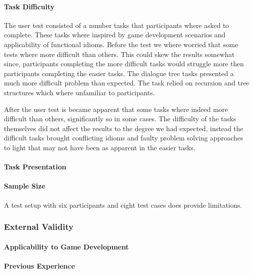 \paragraph{Task Difficulty}
The user test consisted of a number tasks that participants where asked to complete. These tasks where inspired by game development scenarios and applicability of functional idioms. Before the test we where worried that some tests where more difficult than others. This could skew the results somewhat since, participants completing the more difficult tasks would struggle more then participants completing the easier tasks. The dialogue tree tasks presented a much more difficult problem than expected. The task relied on recursion and tree structures which where unfamiliar to participants.

After the user test is became apparent that some tasks where indeed more difficult than others, significantly so in some cases. The difficulty of the tasks themselves did not affect the results to the degree we had expected, instead the difficult tasks brought conflicting idioms and faulty problem solving approaches to light that may not have been as apparent in the easier tasks.


\paragraph{Task Presentation}

\paragraph{Sample Size}
A test setup with six participants and eight test cases does provide limitations.

\subsubsection{External Validity}
\metasheep

\paragraph{Applicability to Game Development}

\paragraph{Previous Experience}

